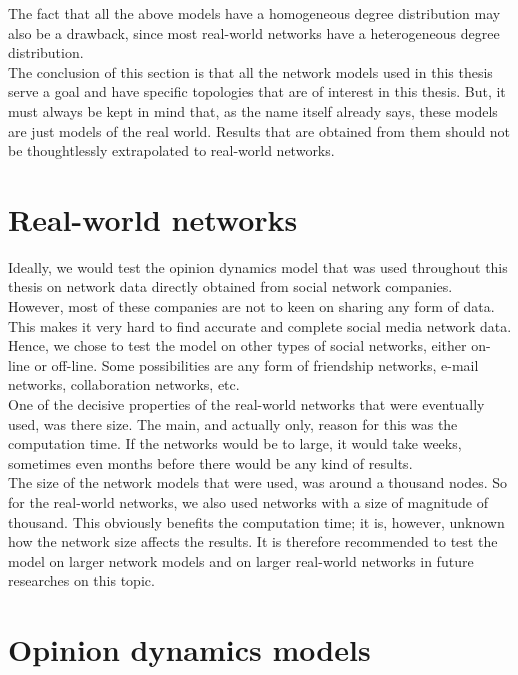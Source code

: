 \documentclass[11 pt , letterpaper , twoside , openright]{book}
\begin{document}
The fact that all the above models have a homogeneous degree distribution may also be a drawback, since most real-world networks have a heterogeneous degree distribution.\\
\newline
The conclusion of this section is that all the network models used in this thesis serve a goal and have specific topologies that are of interest in this thesis. But, it must always be kept in mind that, as the name itself already says, these models are just models of the real world. Results that are obtained from them should not be thoughtlessly extrapolated to real-world networks.


\section{Real-world networks}\label{realnetwork}

Ideally, we would test the opinion dynamics model that was used throughout this thesis on network data directly obtained from social network companies. However, most of these companies are not to keen on sharing any form of data. This makes it very hard to find accurate and complete social media network data. Hence, we chose to test the model on other types of social networks, either on-line or off-line. Some possibilities are any form of friendship networks, e-mail networks, collaboration networks, etc. \\
\newline
One of the decisive properties of the real-world networks that were eventually used, was there size. The main, and actually only, reason for this was the computation time. If the networks would be to large, it would take weeks, sometimes even months before there would be any kind of results.\\
The size of the network models that were used, was around a thousand nodes. So for the real-world networks, we also used networks with a size of magnitude of thousand. This obviously benefits the computation time; it is, however, unknown how the network size affects the results. It is therefore recommended to test the model on larger network models and on larger real-world networks in future researches on this topic.  
\section{Opinion dynamics models}\label{opinionmodel}
\end{document}
